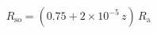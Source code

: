 \documentclass[preview,border=2pt]{standalone}
\begin{document}
\[
R_\mathrm{so}=(0.75+2\times10^{-5}\,z)\,R_\mathrm{a}
\]
\end{document}
